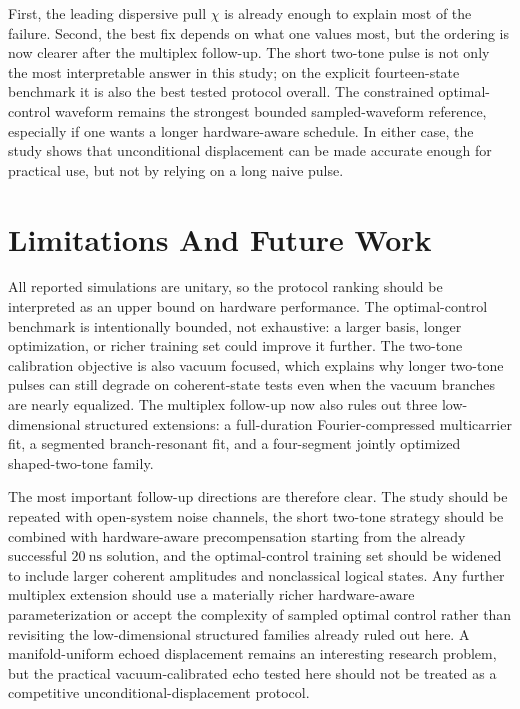 \documentclass[aps,pra,twocolumn,reprint,floatfix,amsmath,amssymb]{revtex4-2}
\begin{document}
First, the leading dispersive pull \(\chi\) is already enough to explain most of the failure. Second, the best fix depends on what one values most, but the ordering is now clearer after the multiplex follow-up. The short two-tone pulse is not only the most interpretable answer in this study; on the explicit fourteen-state benchmark it is also the best tested protocol overall. The constrained optimal-control waveform remains the strongest bounded sampled-waveform reference, especially if one wants a longer hardware-aware schedule. In either case, the study shows that unconditional displacement can be made accurate enough for practical use, but not by relying on a long naive pulse.

\section{Limitations And Future Work}
\label{sec:limitations}

All reported simulations are unitary, so the protocol ranking should be interpreted as an upper bound on hardware performance. The optimal-control benchmark is intentionally bounded, not exhaustive: a larger basis, longer optimization, or richer training set could improve it further. The two-tone calibration objective is also vacuum focused, which explains why longer two-tone pulses can still degrade on coherent-state tests even when the vacuum branches are nearly equalized. The multiplex follow-up now also rules out three low-dimensional structured extensions: a full-duration Fourier-compressed multicarrier fit, a segmented branch-resonant fit, and a four-segment jointly optimized shaped-two-tone family.

The most important follow-up directions are therefore clear. The study should be repeated with open-system noise channels, the short two-tone strategy should be combined with hardware-aware precompensation starting from the already successful \(\SI{20}{\nano\second}\) solution, and the optimal-control training set should be widened to include larger coherent amplitudes and nonclassical logical states. Any further multiplex extension should use a materially richer hardware-aware parameterization or accept the complexity of sampled optimal control rather than revisiting the low-dimensional structured families already ruled out here. A manifold-uniform echoed displacement remains an interesting research problem, but the practical vacuum-calibrated echo tested here should not be treated as a competitive unconditional-displacement protocol.
\end{document}
